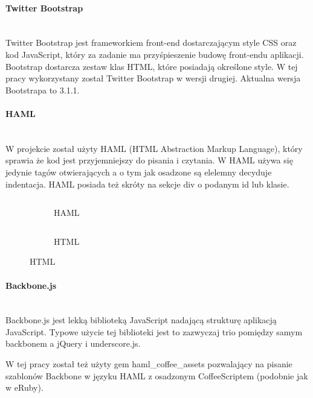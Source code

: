 \documentclass[11pt,a4paper, twoside]{article}
\begin{document}
\paragraph{Twitter Bootstrap} ~\\
\newline
Twitter Bootstrap jest frameworkiem front-end dostarczającym style CSS oraz kod JavaScript, który za zadanie ma przyśpieszenie budowę front-endu aplikacji. Bootstrap dostarcza zestaw klas HTML, które posiadają określone style. W tej pracy wykorzystany został Twitter Bootstrap w wersji drugiej. Aktualna wersja Bootstrapa to 3.1.1.
\paragraph{HAML} ~\\
\newline
W projekcie został użyty HAML (HTML Abstraction Markup Language), który sprawia że kod jest przyjemniejszy do pisania i czytania. W HAML używa się jedynie tagów otwierających a o tym jak osadzone są elelemny decyduje indentacja. HAML posiada też skróty na sekcje div o podanym id lub klasie.
\begin{figure}[h]
\centering
\begin{subfigure}[t]{0.45\textwidth}
\caption{HAML}
\begin{listing}[H]
\inputminted[linenos=true]{haml}{./src/example.haml}
\end{listing}
\end{subfigure}
\begin{subfigure}[t]{0.45\textwidth}
\caption{HTML}
\begin{listing}[H]
\inputminted{html}{./src/example.html}
\end{listing}
\end{subfigure}
\end{figure}
\paragraph{Backbone.js} ~\\
\newline
Backbone.js jest lekką biblioteką JavaScript nadającą strukturę aplikacją JavaScript. Typowe użycie tej biblioteki jest to zazwyczaj trio pomiędzy samym backbonem a jQuery i underscore.js.

W tej pracy został też użyty gem haml\_coffee\_assets pozwalający na pisanie szablonów Backbone w języku HAML z osadzonym CoffeeScriptem (podobnie jak w eRuby). 
\end{document}
